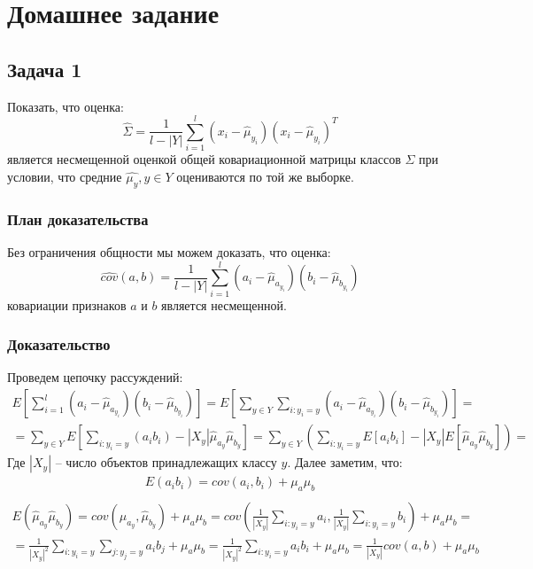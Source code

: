 \documentclass[12pt]{article}
\begin{document}
\section{Домашнее задание}

\subsection*{Задача 1}
Показать, что оценка:
$$
    \hat{\Sigma} = \frac{1}{l - |Y|} \sum_{i=1}^{l}(x_i - \hat{\mu}_{y_i}) (x_i - \hat{\mu}_{y_i})^{T}
$$
является несмещенной оценкой общей ковариационной матрицы классов $\Sigma$  при условии, что средние
$\hat{\mu_y}, y \in Y$ оцениваются по той же выборке.

\subsubsection*{План доказательства}
Без ограничения общности мы можем доказать, что оценка:
$$
    \hat{cov}(a, b) = \frac{1}{l - |Y|} \sum_{i=1}^{l}(a_i - \hat{\mu}_{a_{y_i}}) (b_i - \hat{\mu}_{b_{y_i}})
$$
ковариации признаков $a$ и $b$ является несмещенной.

\subsubsection*{Доказательство}
Проведем цепочку рассуждений:
\begin{align*}
    E\left[\sum_{i = 1}^{l}(a_i - \hat{\mu}_{a_{y_i}}) (b_i - \hat{\mu}_{b_{y_i}})\right] = 
    E\left[\sum_{y \in Y} \sum_{i:y_i = y} (a_i - \hat{\mu}_{a_{y_i}})(b_i - \hat{\mu}_{b_{y_i}})\right] = \\ =
    \sum_{y \in Y} E\left[\sum_{i:y_i = y}(a_i b_i) - |X_y| \hat{\mu}_{a_y} \hat{\mu}_{b_y}\right] =
    \sum_{y \in Y} \left(\sum_{i:y_i = y}E[a_i b_i] - |X_y| E[\hat{\mu}_{a_y} \hat{\mu}_{b_y}]\right) =
\end{align*}
Где $ |X_y| $ -- число объектов принадлежащих классу $ y $. Далее заметим, что:
\begin{align*}
    E(a_{i} b_{i}) = cov(a_i, b_i) + \mu_a \mu_b \\
\end{align*}
\begin{align*}
    E(\hat{\mu}_{a_y} \hat{\mu}_{b_y}) = cov(\hat{\mu}_{a_y}, \hat{\mu}_{b_y}) + \mu_a \mu_b = 
    cov\left(\frac{1}{|X_y|}\sum_{i:y_i = y} a_i, \frac{1}{|X_y|}\sum_{i:y_i = y} b_i\right) + \mu_a \mu_b = \\ =
    \frac{1}{|X_y|^2} \sum_{i:y_i = y} \sum_{j:y_j = y} a_i b_j + \mu_a \mu_b = 
    \frac{1}{|X_y|^2} \sum_{i:y_i = y} a_i b_i + \mu_a \mu_b =
    \frac{1}{|X_y|} cov(a, b) + \mu_a \mu_b
\end{align*}
\end{document}
